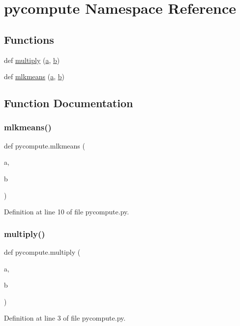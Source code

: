 \hypertarget{namespacepycompute}{}\section{pycompute Namespace Reference}
\label{namespacepycompute}
\subsection*{Functions}
\begin{DoxyCompactItemize}
\item 
def \mbox{\hyperlink{namespacepycompute_af7498e1653825e1a7a7a7d4a1e2701ac}{multiply}} (\mbox{\hyperlink{glad_8h_a3309789fc188587d666cda5ece79cf82}{a}}, \mbox{\hyperlink{glad_8h_a0f71581a41fd2264c8944126dabbd010}{b}})
\item 
def \mbox{\hyperlink{namespacepycompute_a9e38483f46fe7cb78b9168755e4a410d}{mlkmeans}} (\mbox{\hyperlink{glad_8h_a3309789fc188587d666cda5ece79cf82}{a}}, \mbox{\hyperlink{glad_8h_a0f71581a41fd2264c8944126dabbd010}{b}})
\end{DoxyCompactItemize}


\subsection{Function Documentation}
\mbox{\label{namespacepycompute_a9e38483f46fe7cb78b9168755e4a410d}} 
\subsubsection{\texorpdfstring{mlkmeans()}{mlkmeans()}}
{\footnotesize\ttfamily def pycompute.\+mlkmeans (\begin{DoxyParamCaption}\item[{}]{a,  }\item[{}]{b }\end{DoxyParamCaption})}



Definition at line 10 of file pycompute.\+py.

\mbox{\label{namespacepycompute_af7498e1653825e1a7a7a7d4a1e2701ac}} 
\subsubsection{\texorpdfstring{multiply()}{multiply()}}
{\footnotesize\ttfamily def pycompute.\+multiply (\begin{DoxyParamCaption}\item[{}]{a,  }\item[{}]{b }\end{DoxyParamCaption})}



Definition at line 3 of file pycompute.\+py.

